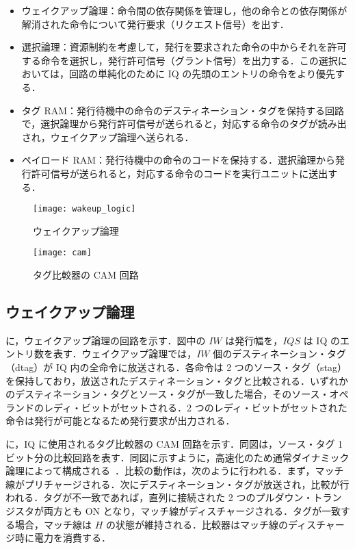 \begin{itemize}
  \item ウェイクアップ論理：命令間の依存関係を管理し，他の命令との依存関係が解消された命令について発行要求（リクエスト信号）を出す．
  \item 選択論理：資源制約を考慮して，発行を要求された命令の中からそれを許可する命令を選択し，発行許可信号（グラント信号）を出力する．この選択においては，回路の単純化のために IQ の先頭のエントリの命令をより優先する．
  \item タグ RAM：発行待機中の命令のデスティネーション・タグを保持する回路で，選択論理から発行許可信号が送られると，対応する命令のタグが読み出され，ウェイクアップ論理へ送られる．
  \item ペイロード RAM：発行待機中の命令のコードを保持する．選択論理から発行許可信号が送られると，対応する命令のコードを実行ユニットに送出する． 
\end{itemize}

\begin{figure}[thb]
  \centering
  \texttt{[image: wakeup\_logic]}
  \caption{ウェイクアップ論理}
  \label{fig:wakeup_logic}
\end{figure}

\begin{figure}[htb]
  \texttt{[image: cam]}
  \caption{タグ比較器の CAM 回路}
  \label{fig:cam}
\end{figure}

\subsection{ウェイクアップ論理}
\label{sec:wakeup_logic}
に，ウェイクアップ論理の回路を示す．図中の $IW$ は発行幅を，$IQS$ は IQ のエントリ数を表す．ウェイクアップ論理では，$IW$ 個のデスティネーション・タグ（dtag）が IQ 内の全命令に放送される．各命令は 2 つのソース・タグ（stag）を保持しており，放送されたデスティネーション・タグと比較される．いずれかのデスティネーション・タグとソース・タグが一致した場合，そのソース・オペランドのレディ・ビットがセットされる．2 つのレディ・ビットがセットされた命令は発行が可能となるため発行要求が出力される．

に，IQ に使用されるタグ比較器の CAM 回路を示す．同図は，ソース・タグ 1 ビット分の比較回路を表す．同図に示すように，高速化のため通常ダイナミック論理によって構成される~\cite{Palacharla1997}．比較の動作は，次のように行われる．まず，マッチ線がプリチャージされる．次にデスティネーション・タグが放送され，比較が行われる．タグが不一致であれば，直列に接続された 2 つのプルダウン・トランジスタが両方とも ON となり，マッチ線がディスチャージされる．タグが一致する場合，マッチ線は $H$ の状態が維持される．比較器はマッチ線のディスチャージ時に電力を消費する．


